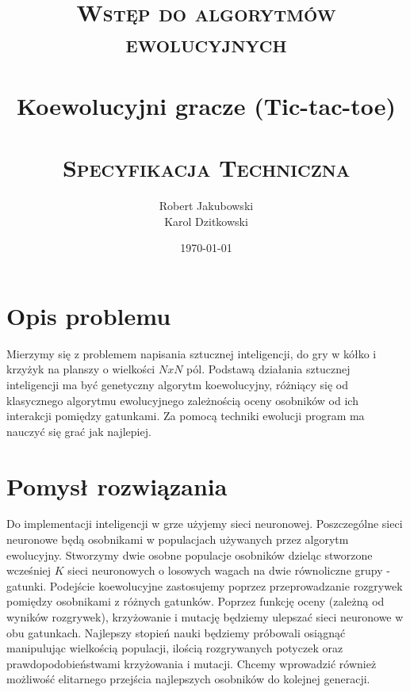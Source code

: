 \documentclass[paper=a4, fontsize=11pt]{scrartcl} %
\title{
\vspace*{\fill}
\normalfont
\textsc{Wstęp do algorytmów ewolucyjnych}\\ [20pt]
\horrule{1.5pt} \\[0.4cm] %
\LARGE Koewolucyjni gracze (Tic-tac-toe)\\ %
\horrule{1.5pt} \\[0.1cm] %
\normalsize
\textsc{Specyfikacja Techniczna} \\ [20pt]
\vspace*{\fill}
}
\author{Robert Jakubowski \\Karol Dzitkowski} %
\date{\normalsize\today} %
\numberwithin{equation}{section} %
\numberwithin{figure}{section} %
\numberwithin{table}{section} %
\begin{document}
\maketitle

\thispagestyle{empty}
\clearpage

\tableofcontents

\clearpage

\section{Opis problemu}
Mierzymy się z problemem napisania sztucznej inteligencji, do gry w kółko i krzyżyk na planszy o wielkości $NxN$ pól.
Podstawą działania sztucznej inteligencji ma być genetyczny algorytm koewolucyjny, różniący się od klasycznego algorytmu ewolucyjnego zależnością oceny osobników od ich interakcji pomiędzy gatunkami. Za pomocą techniki ewolucji program ma nauczyć się grać jak najlepiej. 
\section{Pomysł rozwiązania}
Do implementacji inteligencji w grze użyjemy sieci neuronowej. Poszczególne sieci neuronowe będą osobnikami w populacjach używanych przez algorytm ewolucyjny. Stworzymy dwie osobne populacje osobników dzieląc stworzone wcześniej $K$ sieci neuronowych o losowych wagach na dwie równoliczne grupy - gatunki. Podejście koewolucyjne zastosujemy poprzez przeprowadzanie rozgrywek pomiędzy osobnikami z różnych gatunków. Poprzez funkcję oceny (zależną od wyników rozgrywek), krzyżowanie i mutację będziemy ulepszać sieci neuronowe w obu gatunkach. Najlepszy stopień nauki będziemy próbowali osiągnąć manipulując wielkością populacji, ilością rozgrywanych potyczek oraz prawdopodobieństwami krzyżowania i mutacji. Chcemy wprowadzić również możliwość elitarnego przejścia najlepszych osobników do kolejnej generacji.
\end{document}
